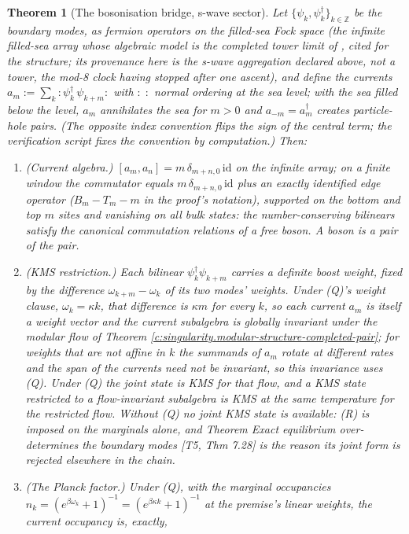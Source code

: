 \documentclass[11pt]{article}
\newtheorem{theorem}{Theorem}[section]
\theoremstyle{definition}
\theoremstyle{plain}
\providecommand{\id}{}\renewcommand{\id}{\mathrm{id}}
\begin{document}
\begin{theorem}[The bosonisation bridge, s-wave sector]\label{c:singularity.bosonisation-bridge-s-wave-sector}
Let $\{\psi_k, \psi^\dagger_k\}_{k \in \mathbb{Z}}$ be the boundary modes, as fermion operators on the filled-sea Fock space (the infinite filled-sea array whose algebraic model is the completed tower limit of \cite[Thm.~5.6]{ButlerT3}, cited for the structure; its provenance here is the s-wave aggregation declared above, not a tower, the mod-8 clock having stopped after one ascent), and define the currents $a_m := \sum_k :\psi^\dagger_k\,\psi_{k+m}:$ with $:\;:$ normal ordering at the sea level; with the sea filled below the level, $a_m$ annihilates the sea for $m > 0$ and $a_{-m} = a_m^{\dagger}$ creates particle-hole pairs. (The opposite index convention flips the sign of the central term; the verification script fixes the convention by computation.) Then:
\begin{enumerate}
\item (Current algebra.) $[a_m, a_n] = m\,\delta_{m+n,0}\,\id$ on the infinite array; on a finite window the commutator equals $m\,\delta_{m+n,0}\,\id$ plus an \emph{exactly identified} edge operator ($B_m - T_m - m$ in the proof's notation), supported on the bottom and top $m$ sites and vanishing on all bulk states: the number-conserving bilinears satisfy the canonical commutation relations of a free boson. A boson is a pair of the pair.
\item (KMS restriction.) Each bilinear $\psi^\dagger_k\psi_{k+m}$ carries a definite boost weight, fixed by the difference $\omega_{k+m} - \omega_k$ of its two modes' weights. Under (Q)'s weight clause, $\omega_k = \kappa k$, that difference is $\kappa m$ for every $k$, so each current $a_m$ is itself a weight vector and the current subalgebra is globally invariant under the modular flow of Theorem \ref{c:singularity.modular-structure-completed-pair}; for weights that are not affine in $k$ the summands of $a_m$ rotate at different rates and the span of the currents need not be invariant, so this invariance uses (Q). Under (Q) the joint state is KMS for that flow, and a KMS state restricted to a flow-invariant subalgebra is KMS at the same temperature for the restricted flow. Without (Q) no joint KMS state is available: (R) is imposed on the marginals alone, and Theorem \emph{Exact equilibrium over-determines the boundary modes} [T5, Thm 7.28] is the reason its joint form is rejected elsewhere in the chain.
\item (The Planck factor.) Under (Q), with the marginal occupancies $n_k = (e^{\beta\omega_k} + 1)^{-1} = (e^{\beta\kappa k} + 1)^{-1}$ at the premise's linear weights, the current occupancy is, exactly,

\end{enumerate}
\end{theorem}
\end{document}
